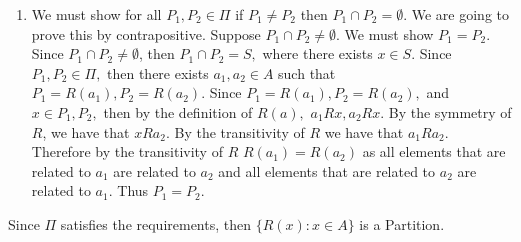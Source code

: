 \documentclass[12pt, letterpaper]{article}
\begin{document}
\begin{itemize}
\begin{enumerate}
			\item We must show for all $P_1, P_2 \in \Pi$ if $P_1 \neq P_2$ then $P_1 \cap P_2 = \emptyset.$  We are going to prove this by contrapositive.  Suppose $P_1 \cap P_2 \neq \emptyset$.  We must show $P_1 = P_2.$  Since $P_1 \cap P_2 \neq \emptyset$, then $P_1 \cap P_2 = S,$ where there exists $x \in S.$  Since $P_1, P_2 \in \Pi,$ then there exists $a_1, a_2 \in A$ such that $P_1 = R(a_1), P_2 = R(a_2).$  Since $P_1 = R(a_1), P_2 = R(a_2),$ and $x \in P_1, P_2,$ then by the definition of $R(a),$ $a_1Rx, a_2Rx.$  By the symmetry of $R$, we have that $xRa_2.$  By the transitivity of $R$ we have that $a_1Ra_2.$  Therefore by the transitivity of $R$ $R(a_1) = R(a_2)$ as all elements that are related to $a_1$ are related to $a_2$ and all elements that are related to $a_2$ are related to $a_1.$  Thus $P_1 = P_2.$
\end{enumerate}	
	Since $\Pi$ satisfies the requirements, then $\{R(x):x\in A\}$ is a Partition.	                                                                                    
	\end{itemize}
	
\end{document}

